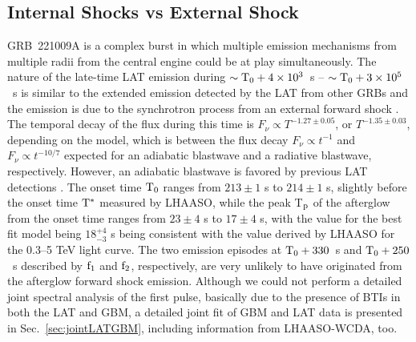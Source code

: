 \documentclass[preprint]{aastex631}
\begin{document}
\subsection{Internal Shocks vs External Shock}
\label{sec:internal_shocks}
GRB~221009A is a complex burst in which multiple emission mechanisms from multiple radii from the central engine could be at play simultaneously. The nature of the late-time LAT emission during $\sim \rm{T}_0+4\times10^3$~s -- $\sim \rm{T}_0+ 3\times 10^5$~s is similar to the extended emission detected by the LAT from other GRBs and the emission is due to the synchrotron process from an external forward shock \citep[see, e.g.,][]{2009MNRAS.400L..75K, 2010MNRAS.403..926G, 2010ApJ...716.1178A, 2010ApJ...724L.109R, 2010ApJ...720.1008C}. The temporal decay of the flux during this time is $F_\nu\propto T^{-1.27\pm 0.05}$, or $T^{-1.35\pm 0.03}$, depending on the model, which is between the flux decay $F_\nu\propto t^{-1}$ and $F_\nu\propto t^{-10/7}$ expected for an adiabatic blastwave and a radiative blastwave, respectively. 
However, an adiabatic blastwave is favored by previous LAT detections \citep{2FLGC}. 
The onset time $\rm{T}_0$ ranges from $213\pm1$ s to $214\pm1$ s, slightly before the onset time $\rm T^{*}$ measured by LHAASO, while the peak T$_{\rm p}$ of the afterglow from the onset time ranges from $23 \pm 4$ s to $17 \pm 4$ s, with the value for the best fit model being $18^{+4}_{-3}$ s being consistent with the value derived by LHAASO for the 0.3--5 TeV light curve.
The two emission episodes at $\rm{T}_0 + 330$~s and $\rm{T}_0 + 250$~s described by $\rm f_{1}$ and $\rm f_2$, respectively, are very unlikely to have originated from the afterglow forward shock emission. 
Although we could not perform a detailed joint spectral analysis of the first pulse, basically due to the presence of BTIs in both the \Fermi LAT and GBM, a detailed joint fit of GBM and LAT data is presented in Sec.~\ref{sec:jointLATGBM}, including information from LHAASO-WCDA, too.
\end{document}
